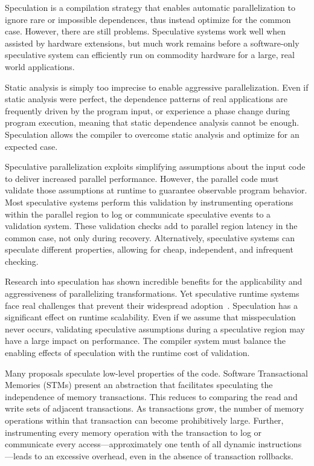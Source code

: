 Speculation is a compilation strategy that enables automatic parallelization
to ignore rare or impossible dependences, thus instead optimize for the
common case. However, there are still problems.  Speculative systems work
well when assisted by hardware extensions, but much work remains before a
software-only speculative system can efficiently run on commodity hardware
for a large, real world applications.

Static analysis is simply too imprecise to enable aggressive
parallelization.  Even if static analysis were perfect, the dependence
patterns of real applications are frequently driven by the program input, or
experience a phase change during program execution, meaning that static
dependence analysis cannot be enough.  Speculation allows the compiler to
overcome static analysis and optimize for an expected case.

Speculative parallelization exploits simplifying assumptions about the
input code to deliver increased parallel performance.  However, the
parallel code must validate those assumptions at runtime to guarantee
observable program behavior.  Most speculative systems perform this
validation by instrumenting operations within the parallel region to
log or communicate speculative events to a validation system.  These
validation checks add to parallel region latency in the common
case, not only during recovery.  Alternatively, speculative systems can
speculate different properties, allowing for cheap, independent,
and infrequent checking.

Research into speculation has shown incredible benefits for the
applicability and aggressiveness of parallelizing transformations. Yet
speculative runtime systems face real challenges that prevent their
widespread adoption~\cite{cascaval:08:stmtoy:short}. Speculation has a
significant effect on runtime scalability.  Even if we assume that
misspeculation never occurs, validating speculative assumptions during a
speculative region may have a large impact on performance. The compiler
system must balance the enabling effects of speculation with the runtime
cost of validation.

Many proposals speculate low-level properties of the code.  Software
Transactional Memories (STMs) present an abstraction that facilitates
speculating the independence of memory transactions.  This reduces to
comparing the read and write sets of adjacent transactions.  As transactions
grow, the number of memory operations within that transaction can become
prohibitively large. Further, instrumenting every memory operation with the
transaction to log or communicate every access---approximately one tenth of
all dynamic instructions---leads to an excessive overhead, even in the
absence of transaction rollbacks.

